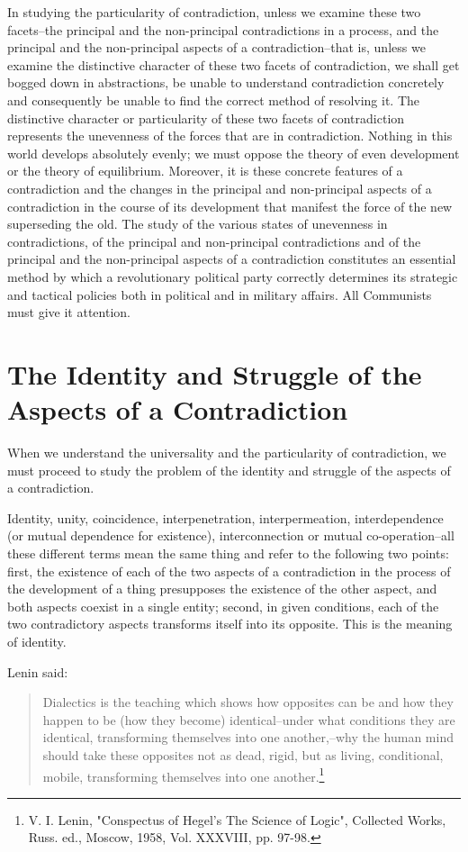 \documentclass{article}
\begin{document}
In studying the particularity of contradiction, unless we examine these two
facets--the principal and the non-principal contradictions in a process, and
the principal and the non-principal aspects of a contradiction--that is, unless
we examine the distinctive character of these two facets of contradiction, we
shall get bogged down in abstractions, be unable to understand contradiction
concretely and consequently be unable to find the correct method of resolving
it. The distinctive character or particularity of these two facets of
contradiction represents the unevenness of the forces that are in
contradiction. Nothing in this world develops absolutely evenly; we must oppose
the theory of even development or the theory of equilibrium. Moreover, it is
these concrete features of a contradiction and the changes in the principal and
non-principal aspects of a contradiction in the course of its development that
manifest the force of the new superseding the old. The study of the various
states of unevenness in contradictions, of the principal and non-principal
contradictions and of the principal and the non-principal aspects of
a contradiction constitutes an essential method by which a revolutionary
political party correctly determines its strategic and tactical policies both
in political and in military affairs. All Communists must give it attention.

\section{The Identity and Struggle of the Aspects of a Contradiction}

When we understand the universality and the particularity of contradiction, we
must proceed to study the problem of the identity and struggle of the aspects
of a contradiction.

Identity, unity, coincidence, interpenetration, interpermeation,
interdependence (or mutual dependence for existence), interconnection or mutual
co-operation--all these different terms mean the same thing and refer to the
following two points: first, the existence of each of the two aspects of
a contradiction in the process of the development of a thing presupposes the
existence of the other aspect, and both aspects coexist in a single entity;
second, in given conditions, each of the two contradictory aspects transforms
itself into its opposite. This is the meaning of identity.

Lenin said:

\begin{quote}
Dialectics is the teaching which shows how opposites can be and how they happen
to be (how they become) identical--under what conditions they are identical,
transforming themselves into one another,--why the human mind should take these
opposites not as dead, rigid, but as living, conditional, mobile, transforming
themselves into one another.\footnote{V. I. Lenin, "Conspectus of Hegel's The
Science of Logic", Collected Works, Russ. ed., Moscow, 1958, Vol. XXXVIII, pp.
97-98.}
\end{quote}
\end{document}
